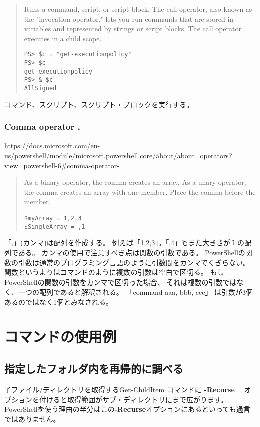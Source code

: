 \documentclass[dvipdfmx]{jsarticle}
\begin{document}
\begin{quote}
Runs a command, script, or script block. The call operator, also known as the "invocation operator," lets you run commands that are stored in variables and represented by strings or script blocks. The call operator executes in a child scope.

\begin{verbatim}
PS> $c = "get-executionpolicy"
PS> $c
get-executionpolicy
PS> & $c
AllSigned
\end{verbatim}
\end{quote}

コマンド、スクリプト、スクリプト・ブロックを実行する。


\subsubsection{Comma operator ,}

\url{https://docs.microsoft.com/en-us/powershell/module/microsoft.powershell.core/about/about_operators?view=powershell-6#comma-operator-}

\begin{quote}
As a binary operator, the comma creates an array. As a unary operator, the comma creates an array with one member. Place the comma before the member.
\begin{verbatim}
$myArray = 1,2,3
$SingleArray = ,1
\end{verbatim}
\end{quote}

「,」(カンマ)は配列を作成する。
例えば「1,2,3」。「,4」もまた大きさが１の配列である。
カンマの使用で注意すべき点は関数の引数である。
PowerShellの関数の引数は通常のプログラミング言語のように引数間をカンマでくぎらない。
関数というよりはコマンドのように複数の引数は空白で区切る。
もしPowerShellの関数の引数をカンマで区切った場合、
それは複数の引数ではなく、一つの配列であると解釈される。
「command aaa, bbb, ccc」 は引数が3個あるのではなく1個とみなされる。
 


\section{コマンドの使用例}

\subsection{指定したフォルダ内を再帰的に調べる}

子ファイル/ディレクトリを取得するGet-ChildItem コマンドに \textbf{-Recurse}　 オプションを付けると取得範囲がサブ・ディレクトリにまで広がります。PowerShellを使う理由の半分はこの\textbf{-Recurse}オプションにあるといっても過言ではありません。
\end{document}
